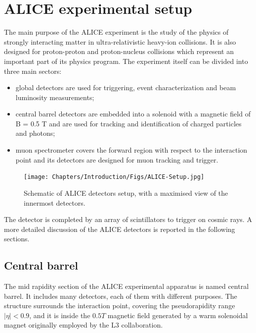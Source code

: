 \section{ALICE experimental setup} %
The main purpose of the ALICE experiment is the study of the physics of strongly interacting matter in ultra-relativistic heavy-ion collisions. It is also designed for proton-proton and proton-nucleus collisions which represent an important part of its physics program. The experiment itself can be divided into three main sectors:
\begin{itemize}
    \item global detectors are used for triggering, event characterization and beam luminosity measurements;
    \item central barrel detectors are embedded into a solenoid with a magnetic field of B = 0.5 T and are used for tracking and identification of charged particles and photons;
    \item muon spectrometer covers the forward region with respect to the interaction point and its detectors are designed for muon tracking and trigger.
\end{itemize}

\begin{figure}[!t]
\begin{center}
\texttt{[image: Chapters/Introduction/Figs/ALICE-Setup.jpg]}
\caption{Schematic of ALICE detectors setup, with a maximised view of the innermost detectors.}
\label{fig:ALICEsetup}
\end{center}
\end{figure}

The detector is completed by an array of scintillators to trigger on cosmic rays.
A more detailed discussion of the ALICE detectors is reported in the following sections.

\subsection{Central barrel}
The mid rapidity section of the ALICE experimental apparatus is named central barrel.
It includes many detectors, each of them with different purposes.
The structure surrounds the interaction point, covering the pseudorapidity range $|\eta| < 0.9$, and it is inside the $0.5 T$ magnetic field generated by a warm solenoidal magnet originally employed by the L3 collaboration.

